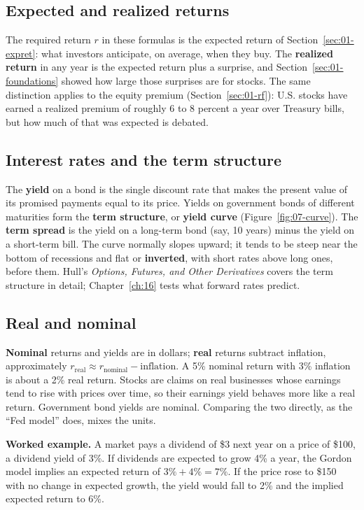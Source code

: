 \subsection{Expected and realized returns}

The required return $r$ in these formulas is the expected return of Section~\ref{sec:01-expret}: what investors anticipate, on average, when they buy. The \textbf{realized return} in any year is the expected return plus a surprise, and Section~\ref{sec:01-foundations} showed how large those surprises are for stocks. The same distinction applies to the equity premium (Section~\ref{sec:01-rf}): U.S. stocks have earned a realized premium of roughly 6 to 8 percent a year over Treasury bills, but how much of that was expected is debated.

\subsection{Interest rates and the term structure}
\label{sec:07-rates}

The \textbf{yield} on a bond is the single discount rate that makes the present value of its promised payments equal to its price. Yields on government bonds of different maturities form the \textbf{term structure}, or \textbf{yield curve} (Figure~\ref{fig:07-curve}). The \textbf{term spread} is the yield on a long-term bond (say, 10 years) minus the yield on a short-term bill. The curve normally slopes upward; it tends to be steep near the bottom of recessions and flat or \textbf{inverted}, with short rates above long ones, before them. Hull's \emph{Options, Futures, and Other Derivatives} covers the term structure in detail; Chapter~\ref{ch:16} tests what forward rates predict.

\subsection{Real and nominal}

\textbf{Nominal} returns and yields are in dollars; \textbf{real} returns subtract inflation, approximately $r_{\text{real}} \approx r_{\text{nominal}} - \text{inflation}$. A 5\% nominal return with 3\% inflation is about a 2\% real return. Stocks are claims on real businesses whose earnings tend to rise with prices over time, so their earnings yield behaves more like a real return. Government bond yields are nominal. Comparing the two directly, as the ``Fed model'' does, mixes the units.

\textbf{Worked example.} A market pays a dividend of \$3 next year on a price of \$100, a dividend yield of 3\%. If dividends are expected to grow 4\% a year, the Gordon model implies an expected return of $3\% + 4\% = 7\%$. If the price rose to \$150 with no change in expected growth, the yield would fall to 2\% and the implied expected return to 6\%.

